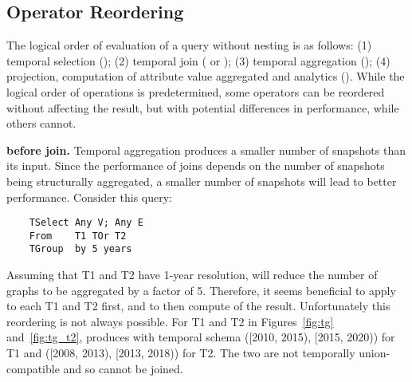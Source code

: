 \subsection{Operator Reordering}
\label{sec:sys:optimization}

The logical order of evaluation of a \ql query without nesting is as
follows: (1) temporal selection (); (2) temporal join
( or ); (3) temporal aggregation
(); (4) projection, computation of attribute value
aggregated and analytics ().  While the logical order
of operations is predetermined, some operators can be reordered
without affecting the result, but with potential differences in
performance, while others cannot. 



{\bf {} before join.}  Temporal aggregation produces a
smaller number of snapshots than its input.  Since the performance of
joins depends on the number of snapshots being structurally
aggregated, a smaller number of snapshots will lead to better
performance.  Consider this query:

\begin{small}
\begin{verbatim}
    TSelect Any V; Any E
    From    T1 TOr T2
    TGroup  by 5 years
\end{verbatim}
\end{small}

Assuming that T1 and T2 have 1-year resolution,  will
reduce the number of graphs to be aggregated by a factor of 5.
Therefore, it seems beneficial to apply  to each T1 and
T2 first, and to then compute  of the result.  Unfortunately
this reordering is not always possible.  For T1 and T2 in
Figures~\ref{fig:tg} and~\ref{fig:tg_t2},  produces \tgs
with temporal schema ([2010, 2015), [2015, 2020)) for T1 and ([2008,
      2013), [2013, 2018)) for T2.  The two \tgs are not temporally
        union-compatible and so cannot be joined.

